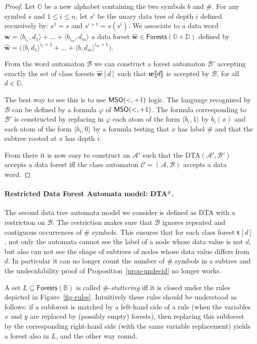 \documentclass{CSML}
\newcommand\dad{\textup{DTA}$^\#$\xspace}
\newcommand\wdad{\textup{DTA}\xspace}
\newcommand\B{\mathbb{B}}
\newcommand\D{\mathbb{D}}
\newcommand\Aa{\mathcal{A}}
\newcommand\Ba{\mathcal{B}}
\newcommand\Ca{\mathcal{C}}
\newcommand\Forests{\mathsf{Forests}}
\newcommand\tree{\boldsymbol{t}}
\newcommand\wtree{\boldsymbol{w}}
\begin{document}
\begin{proof}
Let $\mathbb{O}$ be a new alphabet containing the two symbols $b$ and $\#$. 
For any symbol $s$ and $1 \leq i \leq n$, let $s^i$ be the unary data tree of depth $i$
defined recursively by: $s^1 = s$ and $s^{i+1} = s(s^i)$.
We associate to a data word $\wtree = \langle b_{i_1}, d_1\rangle + \ldots +
\langle b_{i_m}, d_m\rangle$ a data forest 
$\hat{\wtree} \in \Forests(\mathbb{O} \times \D)$ defined by 
$\hat{\wtree} = \bigl(\langle b,d_1\rangle^{i_1+1} + \ldots + \langle b, d_m\rangle^{i_m+1}\bigr)$.

From the word automaton $\Ba$ we can construct a forest automaton $\Ba'$ accepting exactly the set of
class forests $\hat{\wtree}[d]$ such that $\wtree\classproj$ is accepted by
$\Ba$, for all $d\in\D$. 

The best way to see this is to use $\mathsf{MSO}(<,+1)$ logic. The language recognized
by $\Ba$ can be defined by a formula $\varphi$ of $\mathsf{MSO}(<,+1)$. The formula
corresponding to $\Ba'$ is constructed by replacing in $\varphi$ each atom of
the form $\langle b_i,1\rangle$ by $b_i(x)$ and each atom of the form $\langle
b_i,0\rangle$ by a formula testing that $x$ has label $\#$ and that the
subtree rooted at $x$ has depth $i$.

\medskip

From there it is now easy to construct an $\Aa'$ such that the \wdad $(\Aa',\Ba')$
accepts a data forest iff the class automaton $\Ca=(\Aa,\Ba)$ accepts a data word.
\end{proof}

\paragraph{Restricted Data Forest Automata model: \dad.}  
The second data tree automata model we consider is defined as \wdad with a
restriction on $\Ba$. The restriction makes sure that $\Ba$ ignores repeated
and contiguous occurrences of $\#$ symbols.  This ensures that for each class
forest $\tree[d]$, not only the automata cannot see the label of a node whose
data value is not $d$, but also can not see the shape of subtrees of nodes
whose data value differs from $d$. In particular it can no longer count the number
of $\#$ symbols in a subtree and the undecidability proof of
Proposition~\ref{prop-undecid} no longer works.





A set $L \subseteq \Forests(\B)$ is called $\#$-\emph{stuttering} 
iff it is closed  
under the rules depicted in Figure~\ref{fig-rules}. 
Intuitively these rules should be understood as follows: 
if a subforest is matched by a left-hand side of a rule
(when the variables $x$ and $y$ are replaced by (possibly empty) forests), 
then replacing this subforest by the corresponding right-hand side 
(with the same variable replacement)  
yields a forest also in $L$,
and the other way round. 
\end{document}
